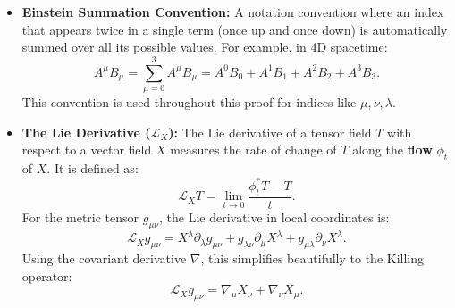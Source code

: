 \begin{solution}
\begin{itemize}
    \item \textbf{Einstein Summation Convention:} A notation convention where an index that appears twice in a single term (once up and once down) is automatically summed over all its possible values. For example, in 4D spacetime:
    \[ A^\mu B_\mu = \sum_{\mu=0}^3 A^\mu B_\mu = A^0 B_0 + A^1 B_1 + A^2 B_2 + A^3 B_3. \]
    This convention is used throughout this proof for indices like $\mu, \nu, \lambda$.

    \item \textbf{The Lie Derivative ($\mathcal{L}_X$):}
    The Lie derivative of a tensor field $T$ with respect to a vector field $X$ measures the rate of change of $T$ along the \textbf{flow} $\phi_t$ of $X$. It is defined as:
    \[ \mathcal{L}_X T = \lim_{t \to 0} \frac{\phi_t^* T - T}{t}. \]
    For the metric tensor $g_{\mu\nu}$, the Lie derivative in local coordinates is:
    \[ \mathcal{L}_X g_{\mu\nu} = X^\lambda \partial_\lambda g_{\mu\nu} + g_{\lambda\nu} \partial_\mu X^\lambda + g_{\mu\lambda} \partial_\nu X^\lambda. \]
    Using the covariant derivative $\nabla$, this simplifies beautifully to the Killing operator:
    \[ \mathcal{L}_X g_{\mu\nu} = \nabla_\mu X_\nu + \nabla_\nu X_\mu. \]


\end{itemize}
\end{solution}
